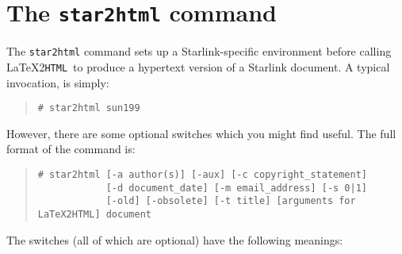\documentclass[twoside,11pt]{article}
\newcommand{\xlabel}[1]{}
\newcommand{\latextohtml}{\LaTeX2\texttt{HTML}}
\renewcommand{\_}{\texttt{\symbol{95}}}
\begin{document}
\newpage
\section{\xlabel{the_star2html_command}The \texttt{star2html} command\label{star2html}}

The \texttt{star2html} command sets up a Starlink-specific environment before
calling \latextohtml\ to produce a hypertext version of a Starlink document.
A typical invocation, is simply:

\begin{quote}
\texttt{\# star2html sun199}
\end{quote}

However, there are some optional switches which you might find useful.
The full format of the command is:

\begin{quote}
\begin{verbatim}
# star2html [-a author(s)] [-aux] [-c copyright_statement] 
            [-d document_date] [-m email_address] [-s 0|1] 
            [-old] [-obsolete] [-t title] [arguments for LaTeX2HTML] document
\end{verbatim}
\end{quote}

The switches (all of which are optional) have the following meanings:
\end{document}
